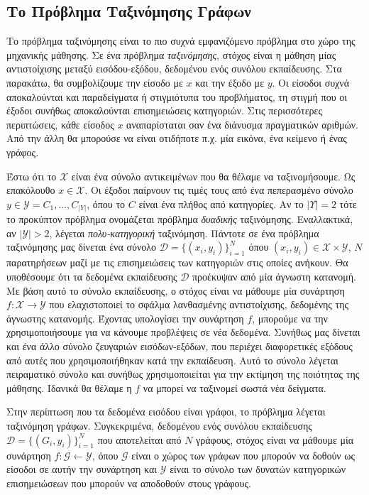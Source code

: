 \subsection{Το Πρόβλημα Ταξινόμησης Γράφων}
\label{subsection:graph_classification}
Το πρόβλημα ταξινόμησης είναι το πιο συχνά εμφανιζόμενο πρόβλημα στο χώρο της μηχανικής μάθησης.
Σε ένα πρόβλημα \textit{ταξινόμησης}, στόχος είναι η μάθηση μίας αντιστοίχισης μεταξύ εισόδου-εξόδου, δεδομένου ενός συνόλου εκπαίδευσης.
Στα παρακάτω, θα συμβολίζουμε την είσοδο με $x$ και την έξοδο με $y$.
Οι είσοδοι συχνά αποκαλούνται και παραδείγματα ή στιγμιότυπα του προβλήματος, τη στιγμή που οι έξοδοι συνήθως αποκαλούνται επισημειώσεις κατηγοριών.
Στις περισσότερες περιπτώσεις, κάθε είσοδος $x$ αναπαρίσταται σαν ένα διάνυσμα πραγματικών αριθμών.
Από την άλλη θα μπορούσε να είναι οτιδήποτε π.χ. μία εικόνα, ένα κείμενο ή ένας γράφος.\par
Έστω ότι το $\mathcal{X}$ είναι ένα σύνολο αντικειμένων που θα θέλαμε να ταξινομήσουμε.
Ως επακόλουθο $x \in \mathcal{X}$.
Οι έξοδοι παίρνουν τις τιμές τους από ένα πεπερασμένο σύνολο $y \in \mathcal{Y} = {C_{1}, \dots, C_{|Y|}}$, όπου το $C$ είναι ένα πλήθος από κατηγορίες.
Αν το $|\mathcal{Υ}| = 2$ τότε το προκύπτον πρόβλημα ονομάζεται πρόβλημα \textit{δυαδικής} ταξινόμησης.
Εναλλακτικά, αν $|\mathcal{Y}| > 2$, λέγεται \textit{πολυ-κατηγορική} ταξινόμηση.
Πάντοτε σε ένα πρόβλημα ταξινόμησης μας δίνεται ένα σύνολο $\mathcal{D} = \{(x_{i}, y_{i})\}^{N}_{i=1}$ όπου $(x_{i}, y_{i}) \in \mathcal{X} \times \mathcal{Y}$, $Ν$ παρατηρήσεων μαζί με τις επισημειώσεις των κατηγοριών στις οποίες ανήκουν.
Θα υποθέσουμε ότι τα δεδομένα εκπαίδευσης $\mathcal{D}$ προέκυψαν από μία άγνωστη κατανομή.
Με βάση αυτό το σύνολο εκπαίδευσης, ο στόχος είναι να μάθουμε μία συνάρτηση $f: \mathcal{X} \rightarrow \mathcal{Y}$ που ελαχιστοποιεί το σφάλμα λανθασμένης αντιστοίχισης, δεδομένης της άγνωστης κατανομής.
Έχοντας υπολογίσει την συνάρτηση $f$, μπορούμε να την χρησιμοποιήσουμε για να κάνουμε προβλέψεις σε νέα δεδομένα.
Συνήθως μας δίνεται και ένα άλλο σύνολο ζευγαριών εισόδων-εξόδων, που περιέχει διαφορετικές εξόδους από αυτές που χρησιμοποιήθηκαν κατά την εκπαίδευση.
Αυτό το σύνολο λέγεται πειραματικό σύνολο και συνήθως χρησιμοποιείται για την εκτίμηση της ποιότητας της μάθησης.
Ιδανικά θα θέλαμε η $f$ να μπορεί να ταξινομεί σωστά νέα δείγματα.\par
Στην περίπτωση που τα δεδομένα εισόδου είναι γράφοι, το πρόβλημα λέγεται ταξινόμηση γράφων.
Συγκεκριμένα, δεδομένου ενός συνόλου εκπαίδευσης $\mathcal{D} = \{(G_{i}, y_{i})\}^{N}_{i=1}$ που αποτελείται από $N$ γράφους, στόχος είναι να μάθουμε μία συνάρτηση $f: \mathcal{G} \leftarrow \mathcal{Y}$, όπου $\mathcal{G}$ είναι ο χώρος των γράφων που μπορούν να δοθούν ως είσοδοι σε αυτήν την συνάρτηση και $\mathcal{Y}$ είναι το σύνολο των δυνατών κατηγορικών επισημειώσεων που μπορούν να αποδοθούν στους γράφους.
